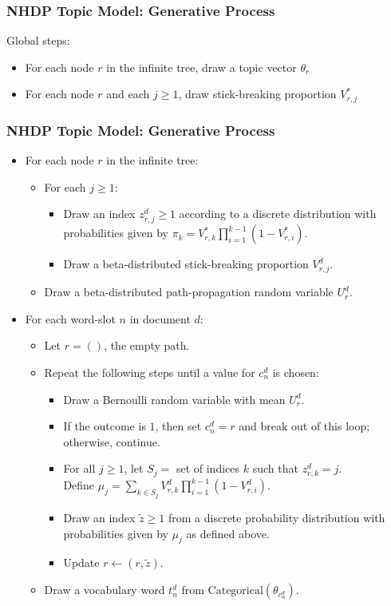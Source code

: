 \begin{frame}
\frametitle{NHDP Topic Model: Generative Process}
Global steps:
\begin{itemize}[<+->]
\item For each node $r$ in the infinite tree, draw a topic vector $\theta_r$
\item For each node $r$ and each $j \geq 1$, draw stick-breaking proportion $V^*_{r,j}$
\end{itemize}
\end{frame}

\begin{frame}
\frametitle{NHDP Topic Model: Generative Process}
  \begin{itemize}[<+->]
  \item For each node $r$ in the infinite tree:
    \begin{itemize}
    \item For each $j \geq 1$:
      \begin{itemize}
      \item Draw an index $z^d_{r,j} \geq 1$ according to a discrete distribution with probabilities given by $\pi_k = V^*_{r,k} \prod_{i=1}^{k-1} (1-V^*_{r,i})$.
      \item Draw a beta-distributed stick-breaking proportion $V^d_{r,j}$.
      \end{itemize}
    \item Draw a beta-distributed path-propagation random variable $U^d_r$.
    \end{itemize}
  \item For each word-slot $n$ in document $d$:
    \begin{itemize}
    \item Let $r = ()$, the empty path.
    \item Repeat the following steps until a value for $c^d_n$ is chosen:
      \begin{itemize}
      \item Draw a Bernoulli random variable with mean $U^d_r$.
      \item If the outcome is $1$, then set $c^d_n = r$ and break out of this loop; otherwise, continue.
      \item For all $j \geq 1$, let $S_j =$ set of indices $k$ such that $z^d_{r,k} = j$. \\
      Define $\mu_j = \sum_{k \in S_j} V^d_{r,k} \prod_{i=1}^{k-1} (1-V^d_{r,i})$.
      \item Draw an index $\tilde z \geq 1$ from a discrete probability distribution with probabilities given by $\mu_j$ as defined above.
      \item Update $r \gets (r, \tilde z)$.
      \end{itemize}
    \item Draw a vocabulary word $t^d_n$ from $\text{Categorical}(\theta_{c^d_n})$.
    \end{itemize}
  \end{itemize}
\end{frame}

